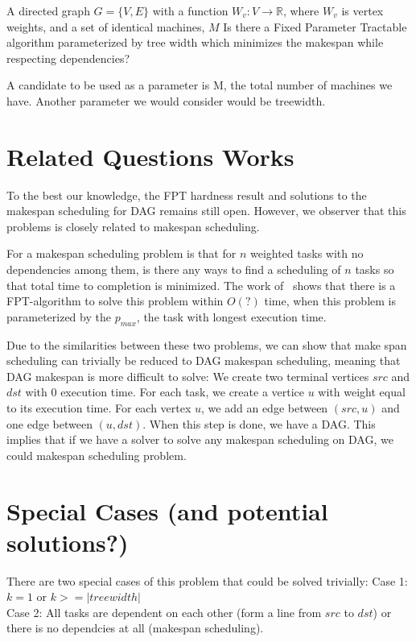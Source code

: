 \documentclass{article}
\begin{document}
%
{A directed graph $G = \{V, E\}$ with a function $W_v: V \to \mathbb{R}$,
 where $W_v$ is vertex weights, and a set of identical machines,
$M$}%
{}%
{Is there a Fixed Parameter Tractable algorithm parameterized by tree width
which  minimizes the makespan while respecting
dependencies?}%

A candidate to be used as a parameter is M, the total number of machines
we have. Another parameter we would consider would be treewidth.

\section{Related Questions Works}
To the best our knowledge, the FPT hardness result and solutions to the 
makespan scheduling for DAG remains still open. 
However, we observer that this problems is closely related to makespan scheduling.

For a makespan scheduling problem is that for $n$ weighted tasks with no
dependencies among them, is there any ways to find a scheduling of $n$
tasks so that total time to completion is minimized. The work of~\cite{keylist}
shows that there is a FPT-algorithm to solve this problem within $O(?)$ time,
when this problem is parameterized by the $p_{max}$, the task with longest
execution time.

Due to the similarities between these two problems, we can show that make
span scheduling can trivially be reduced to DAG makespan scheduling, meaning
that DAG makespan is more difficult to solve:
We create two terminal vertices $src$ and $dst$ with 0 execution time. For each
task, we create a vertice $u$ with weight equal to its execution time. For each
vertex $u$, we add an edge between $(src,u)$ and one edge between $(u,dst)$. 
When this step is done, we have a DAG. 
This implies that if we have a solver to solve any makespan
scheduling on DAG, we could makespan scheduling problem. 

\section{Special Cases (and potential solutions?)}
There are two special cases of this problem that could be solved trivially:
Case 1: $k = 1$ or $k >= |treewidth|$ \\
Case 2: All tasks are dependent on each other (form a line from $src$ to $dst$) 
or there is no dependcies at all (makespan scheduling).
\end{document}
